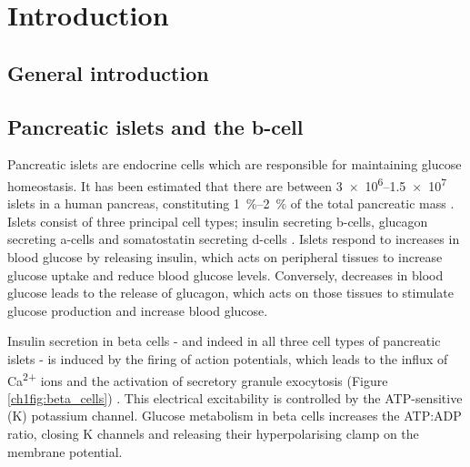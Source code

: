 \chapter{\label{ch:1-intro}Introduction} 

\graphicspath{{figures/ch1/}}

\minitoc

\section{General introduction}

\section{Pancreatic islets and the \textgreek{b}-cell}

Pancreatic islets are endocrine cells which are responsible for maintaining glucose homeostasis.
It has been estimated that there are between \numrange{3e6}{1.5e7} islets in a human pancreas, constituting \SIrange{1}{2}{\percent} of the total pancreatic mass \cite{da_silva_xavier_cells_2018}.
Islets consist of three principal cell types; insulin secreting \textgreek{b}-cells, glucagon secreting \textgreek{a}-cells and somatostatin secreting \textgreek{d}-cells \cite{ashcroft_katp_2013}.
Islets respond to increases in blood glucose by releasing insulin, which acts on peripheral tissues to increase glucose uptake and reduce blood glucose levels.
Conversely, decreases in blood glucose leads to the release of glucagon, which acts on those tissues to stimulate glucose production and increase blood glucose.

Insulin secretion in beta cells - and indeed in all three cell types of pancreatic islets - is induced by the firing of action potentials, which leads to the influx of Ca\textsuperscript{2+} ions and the activation of secretory granule exocytosis (Figure \ref{ch1fig:beta_cells}) \cite{ashcroft_katp_2013}.
This electrical excitability is controlled by the ATP-sensitive (K\ATP{}) potassium channel.
Glucose metabolism in beta cells increases the ATP:ADP ratio, closing K\ATP{} channels and releasing their hyperpolarising clamp on the membrane potential.

